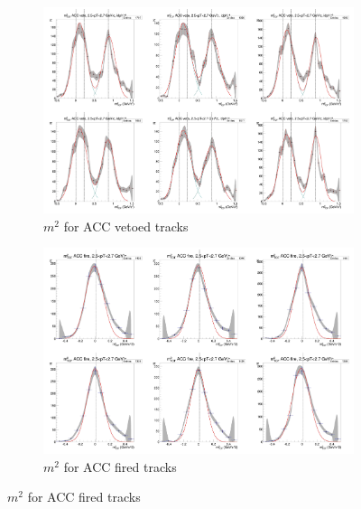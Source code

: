 \begin{figure}[H]
  \ContinuedFloat
    \begin{subfigure}{1\textwidth}
    \includegraphics[width=1\textwidth]{hiptfits/pos/PSm2_cent0_ich1_accfire0_ptbin10.jpg}
    \caption{$m^2$ for ACC vetoed tracks}
    \end{subfigure}
    \begin{subfigure}{1\textwidth}
    \includegraphics[width=1\textwidth]{hiptfits/pos/PSm2_cent0_ich1_accfire1_ptbin10.jpg}
    \caption{$m^2$ for ACC fired tracks}
    \end{subfigure}  
\end{figure}
